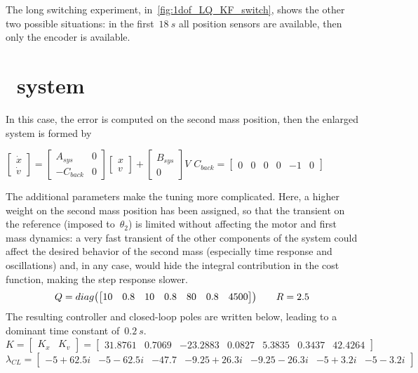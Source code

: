 The long switching experiment, in~\cref{fig:1dof_LQ_KF_switch}, shows the other two possible situations: in the first~$18\ s$ all position sensors are available, then only the encoder is available.

\section{\twodof\ system}

In this case, the error is computed on the second mass position, then the enlarged system is formed by
\begin{center}
	$\begin{bmatrix}
		\dot{x} \\
		\dot{v}
	\end{bmatrix}
	=
	\begin{bmatrix}
		A_{sys} & 0 \\
		-C_{back} & 0
	\end{bmatrix}
	\begin{bmatrix}
		x \\
		v
	\end{bmatrix}
	+
	\begin{bmatrix}
		B_{sys} \\
		0
	\end{bmatrix}
	V$		\qquad $ C_{back} =
	\begin{bmatrix}
		0 & 0 & 0 & 0 & -1 & 0
	\end{bmatrix}$
\end{center}

The additional parameters make the tuning more complicated. Here, a higher weight on the second mass position has been assigned, so that the transient on the reference (imposed to~$\theta_2$) is limited without affecting the motor and first mass dynamics: a very fast transient of the other components of the system could affect the desired behavior of the second mass (especially time response and oscillations) and, in any case, would hide the integral contribution in the cost function, making the step response slower.
\[
	Q = diag
	\bigl{(}
	\begin{bmatrix}
		10 & 0.8 & 10 & 0.8 & 80 & 0.8 & 4500
	\end{bmatrix}
	\bigr{)}
	\qquad
	R = 2.5
\]
The resulting controller and closed-loop poles are written below, leading to a dominant time constant of~$0.2\ s$.
\begin{equation}
	K =
	\left[
	\begin{array}{c|c}
		K_x & K_v
	\end{array}
	\right]
	=
	\left[
	\begin{array}{cccccc|c}
		31.8761 & 0.7069 & -23.2883 & 0.0827 & 5.3835 & 0.3437 & 42.4264
	\end{array}
	\right]
	\label{eq:2dof_LQ_fastK}
\end{equation}
\begin{equation}
	\lambda_{CL} =
	\begin{bmatrix}
		-5+62.5i & -5-62.5i & -47.7 & -9.25+26.3i & -9.25-26.3i & -5+3.2i & -5-3.2i 
	\end{bmatrix}
\end{equation}

